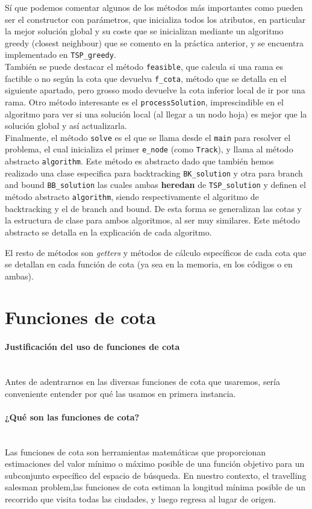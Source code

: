 \documentclass{article}
\newcommand{\myparagraph}[1]{\paragraph{#1}\mbox{}\\}
\begin{document}
Sí que podemos comentar algunos de los métodos más importantes como pueden ser el constructor con parámetros, que inicializa todos los atributos, en particular la mejor solución global y su coste que se inicializan mediante un algoritmo greedy (closest neighbour) que se comento en la práctica anterior,
y se encuentra implementado en \verb|TSP_greedy|. \\

También se puede destacar el método \verb|feasible|, que calcula si una rama es factible o no según la cota que devuelva \verb|f_cota|, método que se detalla en el siguiente apartado, pero grosso modo devuelve la cota inferior local de ir por una rama.
Otro método interesante es el \verb|processSolution|, imprescindible en el algoritmo para ver si una solución local (al llegar a un nodo hoja) es mejor que la solución global y así actualizarla. \\
Finalmente, el método \verb|solve| es el que se llama desde el \verb|main| para resolver el problema, el cual inicializa el primer \verb|e_node| (como \verb|Track|), y llama al método abstracto \verb|algorithm|. Este método es abstracto dado que también hemos realizado una clase especifica para backtracking \verb|BK_solution| y otra para branch and bound \verb|BB_solution| las cuales ambas \textbf{heredan} de \verb|TSP_solution| y definen el método abstracto \verb|algorithm|, siendo respectivamente el algoritmo de backtracking y el de branch and bound. De esta forma se generalizan las cotas y la estructura de clase para ambos algoritmos, al ser muy similares.
Este método abstracto se detalla en la explicación de cada algoritmo.

El resto de métodos son \textit{getters} y métodos de cálculo específicos de cada cota que se detallan en cada función de cota (ya sea en la memoria, en los códigos o en ambas).

\newpage

\section{Funciones de cota}
\myparagraph{Justificación del uso de funciones de cota}
Antes de adentrarnos en las diversas funciones de cota que usaremos, sería conveniente entender por qué las usamos en primera instancia.
\myparagraph{¿Qué son las funciones de cota?}

Las funciones de cota son herramientas matemáticas que proporcionan estimaciones del valor mínimo o máximo posible de una función objetivo para un subconjunto específico del espacio de búsqueda. En nuestro contexto, el travelling salesman problem,las funciones de cota estiman la longitud mínima posible de un recorrido que visita todas las ciudades, y luego regresa al lugar de origen.
\end{document}
